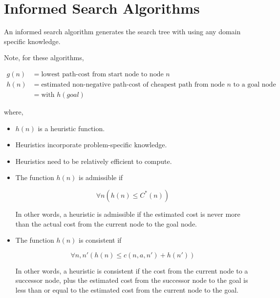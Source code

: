 %
%
%

\section{Informed Search Algorithms}
An informed search algorithm generates the search tree with using any domain specific knowledge.

Note, for these algorithms,

\begin{align*}
    g(n) &= \text{lowest path-cost from start node to node $n$} \\
    h(n) &= \text{estimated non-negative path-cost of cheapest path from node $n$ to a goal node} \\
         &= \text{with $h({goal})$}
\end{align*}

where,

\begin{itemize}
    \item $h(n)$ is a heuristic function.
    \item Heuristics incorporate problem-specific knowledge.
    \item Heuristics need to be relatively efficient to compute.
    \item The function $h(n)$ is admissible if

        \begin{equation*}
            \forall n \left(h(n) \leq C^*(n)\right)
        \end{equation*}

        In other words, a heuristic is admissible if the estimated cost is never more than the actual cost from the current node to the goal node.

    \item The function $h(n)$ is consistent if

        \begin{equation*}
            \forall n, n' \left(h(n) \leq c(n, a, n') + h(n')\right)
        \end{equation*}

        In other words, a heuristic is consistent if the cost from the current node to a successor node, plus the estimated cost from the successor node to the goal is less than or equal to the estimated cost from the current node to the goal.
\end{itemize}

